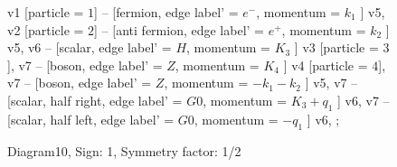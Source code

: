 \documentclass{revtex4}
\begin{document}
\begin{figure}[!htb]
\begin{center}
{    %
v1 [particle = \(1\)] -- [fermion, edge label' = \(e^{-}\), momentum = \(k_{1}\) ] v5, 
v2 [particle = \(2\)] -- [anti fermion, edge label' = \(e^{+}\), momentum = \(k_{2}\) ] v5, 
v6 -- [scalar, edge label' = \(H\), momentum = \(K_{3}\) ] v3 [particle = \(3\)], 
v7 -- [boson, edge label' = \(Z\), momentum = \(K_{4}\) ] v4 [particle = \(4\)], 
v7 -- [boson, edge label' = \(Z\), momentum = \(-k_{1} - k_{2}\) ] v5, 
v7 -- [scalar, half right, edge label' = \(G0\), momentum = \(K_{3} + q_{1}\) ] v6, 
v7 -- [scalar, half left, edge label' = \(G0\), momentum = \(-q_{1}\) ] v6, 
};
\end{center}
\caption{Diagram10, Sign: 1, Symmetry factor: 1/2}
\end{figure}
\newpage
\end{document}

